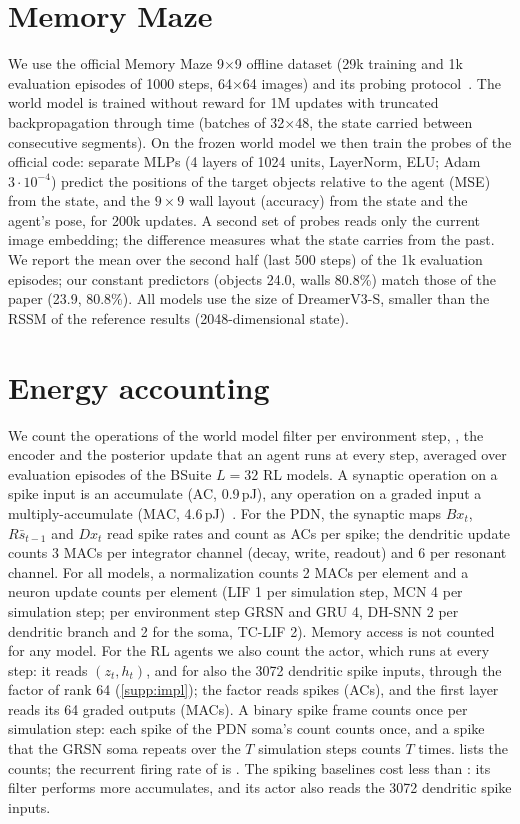 \section{Memory Maze}
\label{supp:mm}

We use the official Memory Maze 9$\times$9 offline dataset (29k training and 1k evaluation episodes of 1000 steps, 64$\times$64 images) and its probing protocol~\cite{pasukonis2023memorymaze}.
The world model is trained without reward for 1M updates with truncated backpropagation through time (batches of 32$\times$48, the state carried between consecutive segments).
On the frozen world model we then train the probes of the official code: separate MLPs (4 layers of 1024 units, LayerNorm, ELU; Adam $3\cdot10^{-4}$) predict the positions of the target objects relative to the agent (MSE) from the state, and the $9\times9$ wall layout (accuracy) from the state and the agent's pose, for 200k updates.
A second set of probes reads only the current image embedding; the difference measures what the state carries from the past.
We report the mean over the second half (last 500 steps) of the 1k evaluation episodes; our constant predictors (objects 24.0, walls 80.8\%) match those of the paper (23.9, 80.8\%).
All models use the size of DreamerV3-S, smaller than the RSSM of the reference results (2048-dimensional state).

\section{Energy accounting}
\label{supp:energy}

We count the operations of the world model filter per environment step, \ie, the encoder and the posterior update that an agent runs at every step, averaged over evaluation episodes of the BSuite $L=32$ RL models.
A synaptic operation on a spike input is an accumulate (AC, 0.9\,pJ), any operation on a graded input a multiply-accumulate (MAC, 4.6\,pJ)~\cite{horowitz2014energy}.
For the PDN, the synaptic maps $Bx_t$, $R\bar s_{t-1}$ and $Dx_t$ read spike rates and count as ACs per spike; the dendritic update counts 3 MACs per integrator channel (decay, write, readout) and 6 per resonant channel. For all models, a normalization counts 2 MACs per element and a neuron update counts per element (LIF 1 per simulation step, MCN 4 per simulation step; per environment step GRSN and GRU 4, DH-SNN 2 per dendritic branch and 2 for the soma, TC-LIF 2).
Memory access is not counted for any model.
For the RL agents we also count the actor, which runs at every step: it reads $(z_t,h_t)$, and for \method also the 3072 dendritic spike inputs, through the factor of rank 64 (\cref{supp:impl}); the factor reads spikes (ACs), and the first layer reads its 64 graded outputs (MACs).
A binary spike frame counts once per simulation step: each spike of the PDN soma's count counts once, and a spike that the GRSN soma repeats over the $T$ simulation steps counts $T$ times.
 lists the counts; the recurrent firing rate of \method is \numEnergyRate.
The spiking baselines cost less than \method: its filter performs more accumulates, and its actor also reads the 3072 dendritic spike inputs.

